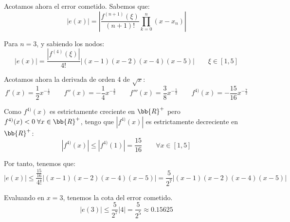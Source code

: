 \begin{ejercicio}
    Acotamos ahora el error cometido. Sabemos que:
    \begin{equation*}
        |e(x)| = \left|\frac{f^{(n+1)}(\xi)}{(n+1)!}\prod_{k=0}^n(x-x_n) \right|
    \end{equation*}

    Para $n=3$, y sabiendo los nodos:
    \begin{equation*}
        |e(x)| = \frac{|f^{(4)}(\xi)|}{4!}\left|(x-1)(x-2)(x-4)(x-5) \right| \qquad \xi \in [1,5]
    \end{equation*}

    Acotamos ahora la derivada de orden 4 de $\sqrt{x}$:
    \begin{equation*}
        f'(x)=\frac{1}{2}x^{-\frac{1}{2}}
        \qquad f''(x)=-\frac{1}{4}x^{-\frac{3}{2}}
        \qquad f'''(x)=\frac{3}{8}x^{-\frac{5}{2}}
        \qquad f^{4)}(x)=-\frac{15}{16}x^{-\frac{7}{2}}
    \end{equation*}

    Como $f^{4)}(x)$ es estrictamente creciente en $\bb{R}^+$ pero $f^{4)}(x)<0\;\forall x\in \bb{R}^+$, tengo que $|f^{4)}(x)|$ es estrictamente decreciente en $\bb{R}^+$:
    \begin{equation*}
        |f^{4)}(x)|\leq |f^{4)}(1)| = \frac{15}{16} \qquad \forall x\in [1,5]
    \end{equation*}

    Por tanto, tenemos que:
    \begin{equation*}
        |e(x)| \leq \frac{\frac{15}{16}}{4!}\left|(x-1)(x-2)(x-4)(x-5) \right| = \frac{5}{2^7}\left|(x-1)(x-2)(x-4)(x-5) \right|
    \end{equation*}
    

    Evaluando en $x=3$, tenemos la cota del error cometido.
    \begin{equation*}
        \left|e\left(3\right)\right| \leq \frac{5}{2^7}\left|4 \right| = \frac{5}{2^5} \approx 0.15625
    \end{equation*}
\end{ejercicio}


